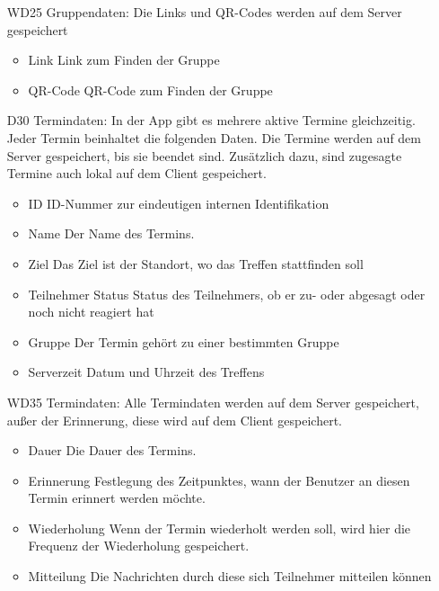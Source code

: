 \documentclass{scrartcl}
\begin{document}
\begin{itemize}
		\newpage
		\item [WD25] Gruppendaten:
		\newline Die Links und QR-Codes werden auf dem \gls{Server} gespeichert
		\begin{itemize}
			\item Link
			\newline Link zum Finden der Gruppe
			\item QR-Code
			\newline QR-Code zum Finden der Gruppe
		\end{itemize}
		
		\item [D30] Termindaten:
		\newline In der App gibt es mehrere aktive Termine gleichzeitig. Jeder Termin beinhaltet die folgenden Daten.
		Die Termine werden auf dem \gls{Server} gespeichert, bis sie beendet sind. Zusätzlich dazu, sind zugesagte Termine auch lokal auf dem \gls{Client} gespeichert.
		\begin{itemize}
			\item ID
			\newline ID-Nummer zur eindeutigen internen Identifikation
			\item Name
			\newline Der Name des Termins.
			\item Ziel
			\newline Das Ziel ist der Standort, wo das Treffen stattfinden soll
			\item \gls{Teilnehmer} Status
			\newline Status des Teilnehmers, ob er zu- oder abgesagt oder noch nicht reagiert hat
			\item Gruppe
			\newline Der Termin gehört zu einer bestimmten Gruppe
			\item Serverzeit
			\newline Datum und Uhrzeit des Treffens
		\end{itemize}
		
		\item [WD35] Termindaten:
Alle Termindaten werden auf dem \gls{Server} gespeichert, außer der Erinnerung, diese wird auf dem \gls{Client} gespeichert.
	 	\begin{itemize}
			\item Dauer
			\newline Die Dauer des Termins.
			\item Erinnerung
			\newline Festlegung des Zeitpunktes, wann der Benutzer an diesen Termin erinnert werden möchte.
			\item Wiederholung
			\newline Wenn der Termin wiederholt werden soll, wird hier die Frequenz der Wiederholung gespeichert.
			\item Mitteilung
			\newline Die Nachrichten durch diese sich \gls{Teilnehmer} mitteilen können
		\end{itemize}
	\end{itemize}
	
\end{document}
